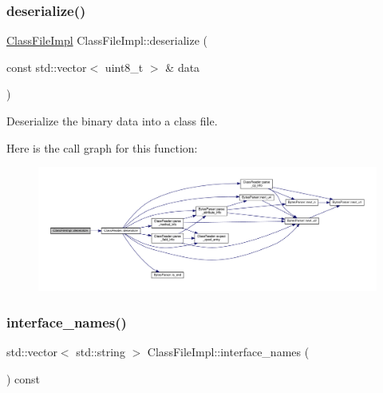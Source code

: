 \subsubsection{\texorpdfstring{deserialize()}{deserialize()}}
{\footnotesize\ttfamily \hyperlink{classClassFileImpl}{Class\+File\+Impl} Class\+File\+Impl\+::deserialize (\begin{DoxyParamCaption}\item[{const std\+::vector$<$ uint8\+\_\+t $>$ \&}]{data }\end{DoxyParamCaption})\hspace{0.3cm}{\ttfamily [static]}}



Deserialize the binary data into a class file. 

Here is the call graph for this function\+:
\nopagebreak
\begin{figure}[H]
\begin{center}
\leavevmode
\includegraphics[width=350pt]{classClassFileImpl_abdfa46cef80b0ec30115f1c0c9bb1db6_cgraph}
\end{center}
\end{figure}
\mbox{\label{classClassFileImpl_ad2154cb52119b87cd74b722b69730dee}} 
\subsubsection{\texorpdfstring{interface\+\_\+names()}{interface\_names()}}
{\footnotesize\ttfamily std\+::vector$<$ std\+::string $>$ Class\+File\+Impl\+::interface\+\_\+names (\begin{DoxyParamCaption}{ }\end{DoxyParamCaption}) const}

